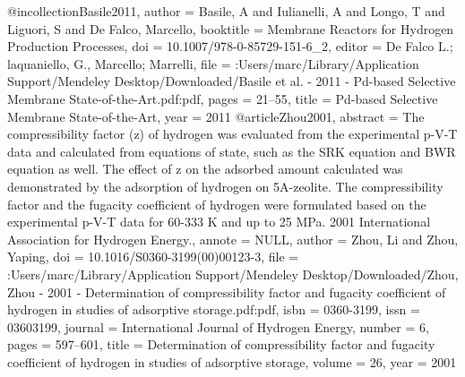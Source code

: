 @incollection{Basile2011,
author = {Basile, A and Iulianelli, A and Longo, T and Liguori, S and {De Falco}, Marcello},
booktitle = {Membrane Reactors for Hydrogen Production Processes},
doi = {10.1007/978-0-85729-151-6_2},
editor = {{De Falco  L.; laquaniello, G.}, Marcello; Marrelli},
file = {:Users/marc/Library/Application Support/Mendeley Desktop/Downloaded/Basile et al. - 2011 - Pd-based Selective Membrane State-of-the-Art.pdf:pdf},
pages = {21--55},
title = {{Pd-based Selective Membrane State-of-the-Art}},
year = {2011}
}
@article{Zhou2001,
abstract = {The compressibility factor (z) of hydrogen was evaluated from the experimental p-V-T data and calculated from equations of state, such as the SRK equation and BWR equation as well. The effect of z on the adsorbed amount calculated was demonstrated by the adsorption of hydrogen on 5A-zeolite. The compressibility factor and the fugacity coefficient of hydrogen were formulated based on the experimental p-V-T data for 60-333 K and up to 25 MPa. {\textcopyright} 2001 International Association for Hydrogen Energy.},
annote = {NULL},
author = {Zhou, Li and Zhou, Yaping},
doi = {10.1016/S0360-3199(00)00123-3},
file = {:Users/marc/Library/Application Support/Mendeley Desktop/Downloaded/Zhou, Zhou - 2001 - Determination of compressibility factor and fugacity coefficient of hydrogen in studies of adsorptive storage.pdf:pdf},
isbn = {0360-3199},
issn = {03603199},
journal = {International Journal of Hydrogen Energy},
number = {6},
pages = {597--601},
title = {{Determination of compressibility factor and fugacity coefficient of hydrogen in studies of adsorptive storage}},
volume = {26},
year = {2001}
}
